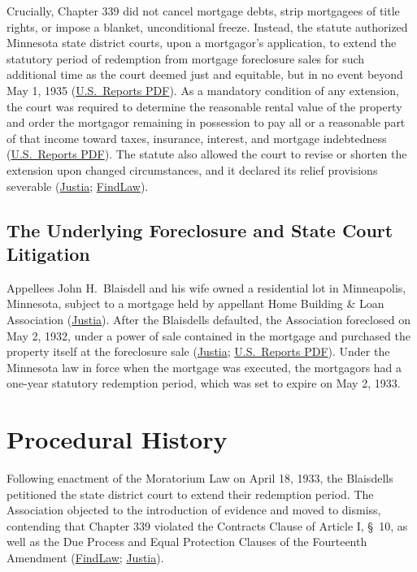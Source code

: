 \documentclass[12pt]{article}
\begin{document}
Crucially, Chapter 339 did not cancel mortgage debts, strip mortgagees of title rights, or impose a blanket, unconditional freeze. Instead, the statute authorized Minnesota state district courts, upon a mortgagor's application, to extend the statutory period of redemption from mortgage foreclosure sales for such additional time as the court deemed just and equitable, but in no event beyond May 1, 1935 (\href{https://tile.loc.gov/storage-services/service/ll/usrep/usrep290/usrep290398/usrep290398.pdf}{U.S.\ Reports PDF}). As a mandatory condition of any extension, the court was required to determine the reasonable rental value of the property and order the mortgagor remaining in possession to pay all or a reasonable part of that income toward taxes, insurance, interest, and mortgage indebtedness (\href{https://tile.loc.gov/storage-services/service/ll/usrep/usrep290/usrep290398/usrep290398.pdf}{U.S.\ Reports PDF}). The statute also allowed the court to revise or shorten the extension upon changed circumstances, and it declared its relief provisions severable (\href{https://supreme.justia.com/cases/federal/us/290/398/}{Justia}; \href{https://caselaw.findlaw.com/court/us-supreme-court/290/398.html}{FindLaw}).

\subsection{The Underlying Foreclosure and State Court Litigation}
Appellees John H.\ Blaisdell and his wife owned a residential lot in Minneapolis, Minnesota, subject to a mortgage held by appellant Home Building \& Loan Association (\href{https://supreme.justia.com/cases/federal/us/290/398/}{Justia}). After the Blaisdells defaulted, the Association foreclosed on May 2, 1932, under a power of sale contained in the mortgage and purchased the property itself at the foreclosure sale (\href{https://supreme.justia.com/cases/federal/us/290/398/}{Justia}; \href{https://tile.loc.gov/storage-services/service/ll/usrep/usrep290/usrep290398/usrep290398.pdf}{U.S.\ Reports PDF}). Under the Minnesota law in force when the mortgage was executed, the mortgagors had a one-year statutory redemption period, which was set to expire on May 2, 1933.

\section{Procedural History}
Following enactment of the Moratorium Law on April 18, 1933, the Blaisdells petitioned the state district court to extend their redemption period. The Association objected to the introduction of evidence and moved to dismiss, contending that Chapter 339 violated the Contracts Clause of Article I, \S\ 10, as well as the Due Process and Equal Protection Clauses of the Fourteenth Amendment (\href{https://caselaw.findlaw.com/court/us-supreme-court/290/398.html}{FindLaw}; \href{https://supreme.justia.com/cases/federal/us/290/398/}{Justia}).
\end{document}
